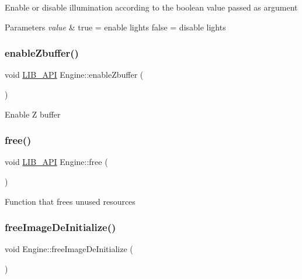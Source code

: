 Enable or disable illumination according to the boolean value passed as argument 
\begin{DoxyParams}{Parameters}
{\em value} & true = enable lights false = disable lights \\
\hline
\end{DoxyParams}
\mbox{\label{classEngine_a0508a50886cadf9d264e06811fa49e45}} 
\subsubsection{\texorpdfstring{enable\+Zbuffer()}{enableZbuffer()}}
{\footnotesize\ttfamily void \hyperlink{Engine_8h_a77278c8cc96e39fb27b5d0a347c8fb3d}{L\+I\+B\+\_\+\+A\+PI} Engine\+::enable\+Zbuffer (\begin{DoxyParamCaption}{ }\end{DoxyParamCaption})}

Enable Z buffer \mbox{\label{classEngine_a2dfa731be604b9bf6d3292c464fb1736}} 
\subsubsection{\texorpdfstring{free()}{free()}}
{\footnotesize\ttfamily void \hyperlink{Engine_8h_a77278c8cc96e39fb27b5d0a347c8fb3d}{L\+I\+B\+\_\+\+A\+PI} Engine\+::free (\begin{DoxyParamCaption}{ }\end{DoxyParamCaption})}

Function that frees unused resources \mbox{\label{classEngine_a276a5a08cd53ff62495737ede775c23b}} 
\subsubsection{\texorpdfstring{free\+Image\+De\+Initialize()}{freeImageDeInitialize()}}
{\footnotesize\ttfamily void Engine\+::free\+Image\+De\+Initialize (\begin{DoxyParamCaption}{ }\end{DoxyParamCaption})}

